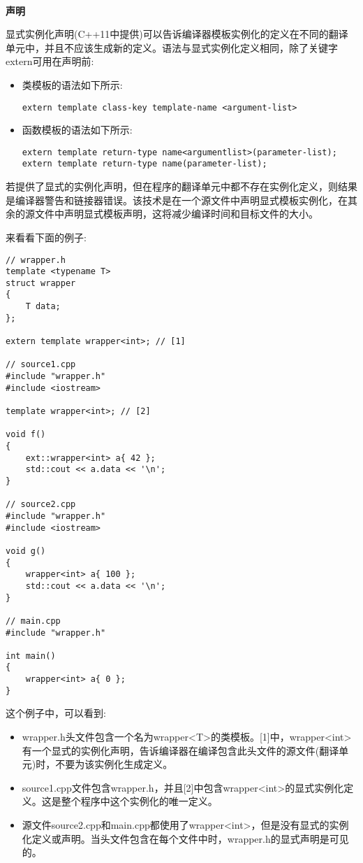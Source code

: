 \hspace*{\fill} \\ %
\noindent\textbf{声明}

显式实例化声明(C++11中提供)可以告诉编译器模板实例化的定义在不同的翻译单元中，并且不应该生成新的定义。语法与显式实例化定义相同，除了关键字extern可用在声明前:

\begin{itemize}
\item 
类模板的语法如下所示:
\begin{lstlisting}[style=styleCXX]
extern template class-key template-name <argument-list>
\end{lstlisting}

\item 
函数模板的语法如下所示:
\begin{lstlisting}[style=styleCXX]
extern template return-type name<argumentlist>(parameter-list);
extern template return-type name(parameter-list);
\end{lstlisting}
\end{itemize}

若提供了显式的实例化声明，但在程序的翻译单元中都不存在实例化定义，则结果是编译器警告和链接器错误。该技术是在一个源文件中声明显式模板实例化，在其余的源文件中声明显式模板声明，这将减少编译时间和目标文件的大小。

来看看下面的例子:

\begin{lstlisting}[style=styleCXX]
// wrapper.h
template <typename T>
struct wrapper
{
	T data;
};

extern template wrapper<int>; // [1]

// source1.cpp
#include "wrapper.h"
#include <iostream>

template wrapper<int>; // [2]

void f()
{
	ext::wrapper<int> a{ 42 };
	std::cout << a.data << '\n';
}

// source2.cpp
#include "wrapper.h"
#include <iostream>

void g()
{
	wrapper<int> a{ 100 };
	std::cout << a.data << '\n';
}

// main.cpp
#include "wrapper.h"

int main()
{
	wrapper<int> a{ 0 };
}
\end{lstlisting}

这个例子中，可以看到:

\begin{itemize}
\item 
wrapper.h头文件包含一个名为wrapper<T>的类模板。[1]中，wrapper<int>有一个显式的实例化声明，告诉编译器在编译包含此头文件的源文件(翻译单元)时，不要为该实例化生成定义。

\item 
source1.cpp文件包含wrapper.h，并且[2]中包含wrapper<int>的显式实例化定义。这是整个程序中这个实例化的唯一定义。

\item 
源文件source2.cpp和main.cpp都使用了wrapper<int>，但是没有显式的实例化定义或声明。当头文件包含在每个文件中时，wrapper.h的显式声明是可见的。
\end{itemize}

